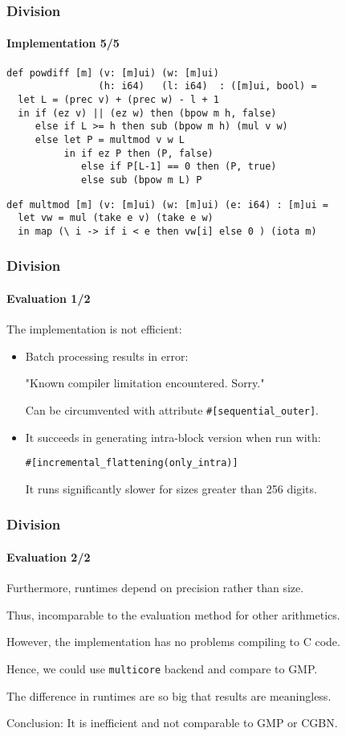\begin{frame}[fragile]
  \frametitle{Division}
  \framesubtitle{Implementation 5/5}
\begin{lstlisting}[language=futhark,basicstyle=\scriptsize,escapeinside=@@,firstnumber=49,frame=single]
def powdiff [m] (v: [m]ui) (w: [m]ui)
                (h: i64)   (l: i64)  : ([m]ui, bool) =
  let L = (prec v) + (prec w) - l + 1
  in if (ez v) || (ez w) then (bpow m h, false)
     else if L >= h then sub (bpow m h) (mul v w)
     else let P = multmod v w L
          in if ez P then (P, false)
             else if P[L-1] == 0 then (P, true)
             else sub (bpow m L) P
\end{lstlisting}\vspace*{0.5em}

\begin{lstlisting}[language=futhark,basicstyle=\scriptsize,escapeinside=@@,firstnumber=58,frame=single]
def multmod [m] (v: [m]ui) (w: [m]ui) (e: i64) : [m]ui =
  let vw = mul (take e v) (take e w)
  in map (\ i -> if i < e then vw[i] else 0 ) (iota m)
\end{lstlisting}
\end{frame}

\begin{frame}[fragile]
  \frametitle{Division}
  \framesubtitle{Evaluation 1/2}
  The implementation is not efficient:
  \begin{itemize}\footnotesize
  \item Batch processing results in error:

    "Known compiler limitation encountered. Sorry."

    Can be circumvented with attribute \texttt{\#[sequential\_outer]}.\pause

  \item It succeeds in generating intra-block version when run with:

    \texttt{\#[incremental\_flattening(only\_intra)]}

    It runs significantly slower for sizes greater than 256 digits.
  \end{itemize}
\end{frame}

\begin{frame}[fragile]
  \frametitle{Division}
  \framesubtitle{Evaluation 2/2}
  Furthermore, runtimes depend on precision rather than size.

  Thus, incomparable to the evaluation method for other arithmetics.\pause

  \phantom{~}

  However, the implementation has no problems compiling to C code.

  Hence, we could use \texttt{multicore} backend and compare to GMP.

  The difference in runtimes are so big that results are meaningless.\pause

  \phantom{~}

  Conclusion: It is inefficient and not comparable to GMP or CGBN.
\end{frame}

